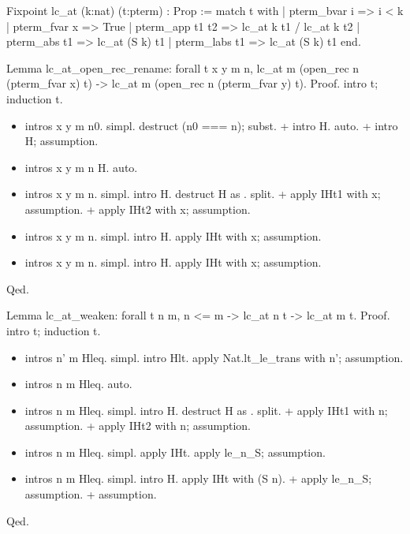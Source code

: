 Fixpoint lc\_at (k:nat) (t:pterm) : Prop :=
  match t with
  | pterm\_bvar i    => i < k
  | pterm\_fvar x    => True
  | pterm\_app t1 t2 => lc\_at k t1 / lc\_at k t2
  | pterm\_abs t1    => lc\_at (S k) t1
  | pterm\_labs t1    => lc\_at (S k) t1
  end.


Lemma lc\_at\_open\_rec\_rename: forall t x y m n, lc\_at m (open\_rec n (pterm\_fvar x) t) -> lc\_at m (open\_rec n (pterm\_fvar y) t).
Proof.
  intro t; induction t.

\begin{itemize}
\item  intros x y m n0.
    simpl. destruct (n0 === n); subst.
    + intro H.
      auto.
    + intro H; assumption.

\item  intros x y m n H.
    auto.

\item  intros x y m n. 
    simpl.
    intro H.
    destruct H as  .
    split.
    + apply IHt1 with x; assumption.
    + apply IHt2 with x; assumption.

\item  intros x y m n.
    simpl.
    intro H.
    apply IHt with x; assumption.

\item  intros x y m n.
    simpl.
    intro H.
    apply IHt with x; assumption.

\end{itemize}
Qed.


Lemma lc\_at\_weaken: forall t n m, n <= m -> lc\_at n t -> lc\_at m t.
Proof.
  intro t; induction t.

\begin{itemize}
\item  intros n' m Hleq.
    simpl.
    intro Hlt.
    apply Nat.lt\_le\_trans with n'; assumption.

\item  intros n m Hleq.
    auto.

\item  intros n m Hleq.
    simpl.
    intro H.
    destruct H as  .
    split.
    + apply IHt1 with n; assumption.
    + apply IHt2 with n; assumption.

\item  intros n m Hleq.
    simpl.
    apply IHt.
    apply le\_n\_S; assumption.

\item  intros n m Hleq.
    simpl.
    intro H.
    apply IHt with (S n).
    + apply le\_n\_S; assumption.
    + assumption.

\end{itemize}
Qed.



